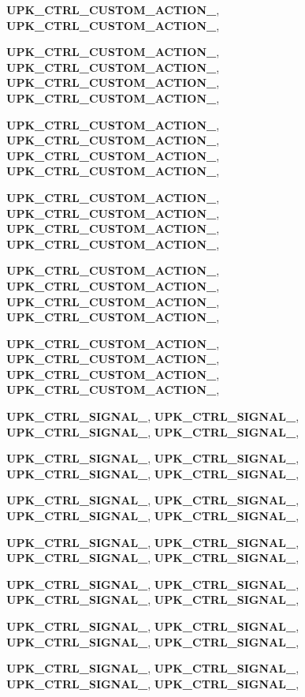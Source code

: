 \begin{DoxyCompactItemize}
{\bf UPK\_\-CTRL\_\-CUSTOM\_\-ACTION\_}, 
{\bf UPK\_\-CTRL\_\-CUSTOM\_\-ACTION\_}, 
\par
{\bf UPK\_\-CTRL\_\-CUSTOM\_\-ACTION\_}, 
{\bf UPK\_\-CTRL\_\-CUSTOM\_\-ACTION\_}, 
{\bf UPK\_\-CTRL\_\-CUSTOM\_\-ACTION\_}, 
{\bf UPK\_\-CTRL\_\-CUSTOM\_\-ACTION\_}, 
\par
{\bf UPK\_\-CTRL\_\-CUSTOM\_\-ACTION\_}, 
{\bf UPK\_\-CTRL\_\-CUSTOM\_\-ACTION\_}, 
{\bf UPK\_\-CTRL\_\-CUSTOM\_\-ACTION\_}, 
{\bf UPK\_\-CTRL\_\-CUSTOM\_\-ACTION\_}, 
\par
{\bf UPK\_\-CTRL\_\-CUSTOM\_\-ACTION\_}, 
{\bf UPK\_\-CTRL\_\-CUSTOM\_\-ACTION\_}, 
{\bf UPK\_\-CTRL\_\-CUSTOM\_\-ACTION\_}, 
{\bf UPK\_\-CTRL\_\-CUSTOM\_\-ACTION\_}, 
\par
{\bf UPK\_\-CTRL\_\-CUSTOM\_\-ACTION\_}, 
{\bf UPK\_\-CTRL\_\-CUSTOM\_\-ACTION\_}, 
{\bf UPK\_\-CTRL\_\-CUSTOM\_\-ACTION\_}, 
{\bf UPK\_\-CTRL\_\-CUSTOM\_\-ACTION\_}, 
\par
{\bf UPK\_\-CTRL\_\-CUSTOM\_\-ACTION\_}, 
{\bf UPK\_\-CTRL\_\-CUSTOM\_\-ACTION\_}, 
{\bf UPK\_\-CTRL\_\-CUSTOM\_\-ACTION\_}, 
{\bf UPK\_\-CTRL\_\-CUSTOM\_\-ACTION\_}, 
\par
{\bf UPK\_\-CTRL\_\-SIGNAL\_}, 
{\bf UPK\_\-CTRL\_\-SIGNAL\_}, 
{\bf UPK\_\-CTRL\_\-SIGNAL\_}, 
{\bf UPK\_\-CTRL\_\-SIGNAL\_}, 
\par
{\bf UPK\_\-CTRL\_\-SIGNAL\_}, 
{\bf UPK\_\-CTRL\_\-SIGNAL\_}, 
{\bf UPK\_\-CTRL\_\-SIGNAL\_}, 
{\bf UPK\_\-CTRL\_\-SIGNAL\_}, 
\par
{\bf UPK\_\-CTRL\_\-SIGNAL\_}, 
{\bf UPK\_\-CTRL\_\-SIGNAL\_}, 
{\bf UPK\_\-CTRL\_\-SIGNAL\_}, 
{\bf UPK\_\-CTRL\_\-SIGNAL\_}, 
\par
{\bf UPK\_\-CTRL\_\-SIGNAL\_}, 
{\bf UPK\_\-CTRL\_\-SIGNAL\_}, 
{\bf UPK\_\-CTRL\_\-SIGNAL\_}, 
{\bf UPK\_\-CTRL\_\-SIGNAL\_}, 
\par
{\bf UPK\_\-CTRL\_\-SIGNAL\_}, 
{\bf UPK\_\-CTRL\_\-SIGNAL\_}, 
{\bf UPK\_\-CTRL\_\-SIGNAL\_}, 
{\bf UPK\_\-CTRL\_\-SIGNAL\_}, 
\par
{\bf UPK\_\-CTRL\_\-SIGNAL\_}, 
{\bf UPK\_\-CTRL\_\-SIGNAL\_}, 
{\bf UPK\_\-CTRL\_\-SIGNAL\_}, 
{\bf UPK\_\-CTRL\_\-SIGNAL\_}, 
\par
{\bf UPK\_\-CTRL\_\-SIGNAL\_}, 
{\bf UPK\_\-CTRL\_\-SIGNAL\_}, 
{\bf UPK\_\-CTRL\_\-SIGNAL\_}, 
{\bf UPK\_\-CTRL\_\-SIGNAL\_}, 
\par

\end{DoxyCompactItemize}
